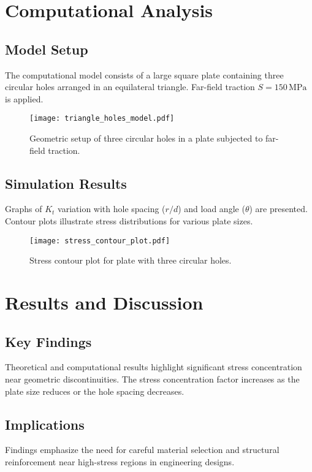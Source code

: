 \documentclass[a4paper,11pt]{article}
\begin{document}
\section{Computational Analysis}
\subsection{Model Setup}
The computational model consists of a large square plate containing three circular holes arranged in an equilateral triangle. Far-field traction \(S = 150 \, \text{MPa}\) is applied.

\begin{figure}[H]
    \centering
    \texttt{[image: triangle\_holes\_model.pdf]} %
    \caption{Geometric setup of three circular holes in a plate subjected to far-field traction.}
    \label{fig:three_holes}
\end{figure}

\subsection{Simulation Results}
Graphs of \(K_t\) variation with hole spacing (\(r/d\)) and load angle (\(\theta\)) are presented. Contour plots illustrate stress distributions for various plate sizes.

\begin{figure}[H]
    \centering
    \texttt{[image: stress\_contour\_plot.pdf]} %
    \caption{Stress contour plot for plate with three circular holes.}
    \label{fig:stress_contour}
\end{figure}

\section{Results and Discussion}
\subsection{Key Findings}
Theoretical and computational results highlight significant stress concentration near geometric discontinuities. The stress concentration factor increases as the plate size reduces or the hole spacing decreases.

\subsection{Implications}
Findings emphasize the need for careful material selection and structural reinforcement near high-stress regions in engineering designs.
\end{document}
